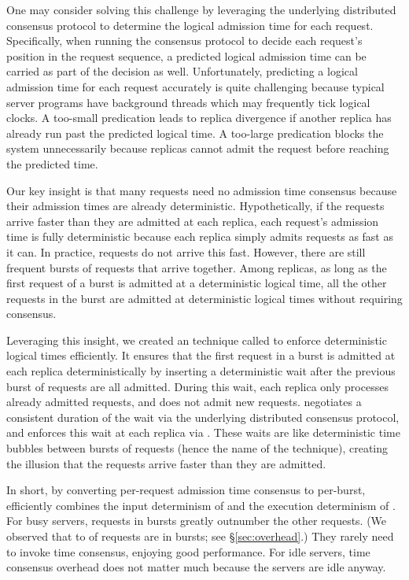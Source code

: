 One may consider solving this challenge by leveraging the underlying
distributed consensus protocol to determine the logical admission time for each
request.  Specifically, when running the consensus protocol to decide each
request's position in the request sequence, a predicted logical admission time 
can be carried as part of the decision as well. Unfortunately, 
predicting a logical admission time for each request accurately is quite 
challenging because typical server programs have background threads which 
may frequently tick logical clocks. A too-small predication leads to 
replica divergence if another replica has already run past the predicted 
logical time. A too-large predication blocks the system unnecessarily 
because replicas cannot admit the request before reaching the predicted time.

Our key insight is that many requests need no admission time consensus
because their admission times are already deterministic.  Hypothetically,
if the requests arrive faster than they are admitted at each replica, each
request's admission time is fully deterministic because each replica
simply admits requests as fast as it can. In practice, requests do not arrive 
this fast.  However, there are still frequent bursts of requests that arrive 
together. Among replicas, as long as the first request of a burst is admitted at 
a deterministic logical time, all the other requests in the burst are admitted 
at deterministic logical times without requiring consensus.

Leveraging this insight, we created an technique called \emph{\timealgo} to 
enforce deterministic logical times efficiently.  It ensures that the 
first request in a burst is admitted at each replica deterministically by 
inserting a deterministic wait after the previous burst of requests are all 
admitted.  During this wait, each replica only processes already admitted 
requests, and does not admit new requests.  \xxx negotiates a consistent 
duration of the wait via the underlying distributed consensus protocol, and 
enforces this wait at each replica via \dmt.  These waits are like 
deterministic time bubbles between bursts of requests (hence the name of the 
technique), creating the illusion that the requests arrive faster than they are 
admitted.

In short, by converting per-request admission time consensus to per-burst,
\timealgo efficiently combines the input determinism of \paxos and the
execution determinism of \dmt.  For busy servers, requests in bursts
greatly outnumber the other requests.  (We observed that \timebubblelow to
\timebubblehigh of requests are in bursts; see \S\ref{sec:overhead}.) They
rarely need to invoke time consensus, enjoying good performance.  For idle
servers, time consensus overhead does not matter much because the servers
are idle anyway.


